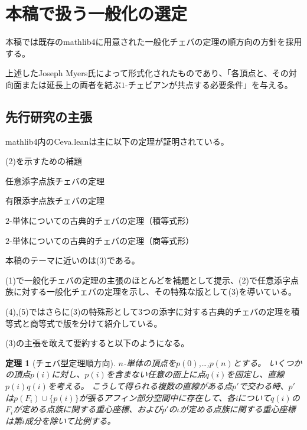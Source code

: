 \documentclass[a4paper,12pt]{bxjsbook}
\newlength{\customindent}
\newenvironment{body}{
  \par
  \begingroup
  \setlength{\leftskip}{\customindent}
  \setlength{\rightskip}{0pt}
  \setlength{\parindent}{1em}
  \setlength{\displayindent}{\customindent}
  \setlength{\displaywidth}{\dimexpr\linewidth-\customindent\relax}
}{
  \par
  \endgroup
}
\theoremstyle{theorem}
\newtheorem{theorem}{定理}[chapter]
\begin{document}
    \section{本稿で扱う一般化の選定}
    \begin{body}
        \indent 本稿では既存のmathlib4に用意された一般化チェバの定理の順方向の方針を採用する。

        \indent 上述したJoseph Myers氏によって形式化されたものであり、「各頂点と、その対向面または延長上の両者を結ぶ$1$-チェビアンが共点する必要条件」を与える。
    \end{body}

    \subsection{先行研究の主張}

    \begin{body}
        \indent mathlib4内のCeva.leanは主に以下の定理が証明されている。
        
        \begin{bodyenumerate}
            \item (2)を示すための補題
            \item 任意添字点族チェバの定理
            \item 有限添字点族チェバの定理
            \item $2$-単体についての古典的チェバの定理（積等式形）
            \item $2$-単体についての古典的チェバの定理（商等式形）
        \end{bodyenumerate}
        \indent 本稿のテーマに近いのは(3)である。

        \indent (1)で一般化チェバの定理の主張のほとんどを補題として提示、(2)で任意添字点族に対する一般化チェバの定理を示し、その特殊な版として(3)を導いている。
            
        \indent (4),(5)ではさらに(3)の特殊形として3つの添字に対する古典的チェバの定理を積等式と商等式で版を分けて紹介している。

        \indent (3)の主張を敢えて要約すると以下のようになる。
    \end{body}

    \begin{theorem}[チェバ型定理順方向]
        $n$-単体の頂点を$p(0)$,…,$p(n)$とする。
        いくつかの頂点$p(i)$に対し、$p(i)$を含まない任意の面上に点$q(i)$を固定し、直線$p(i)q(i)$を考える。
        こうして得られる複数の直線がある点$p'$で交わる時、$p'$は$p(F_i)\cup \{p(i)\}$が張るアフィン部分空間中に存在して、各iについて$q(i)$の$F_i$が定める点族に関する重心座標、および$p'$の$\iota$が定める点族に関する重心座標は第$i$成分を除いて比例する。
    \end{theorem}
\end{document}

